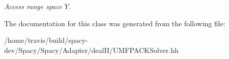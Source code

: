 \begin{DoxyCompactItemize}
\begin{DoxyCompactList}\small\item\em Access range space $Y$. \end{DoxyCompactList}\end{DoxyCompactItemize}


The documentation for this class was generated from the following file\-:\begin{DoxyCompactItemize}
\item 
/home/travis/build/spacy-\/dev/\-Spacy/\-Spacy/\-Adapter/deal\-I\-I/U\-M\-F\-P\-A\-C\-K\-Solver.\-hh\end{DoxyCompactItemize}
